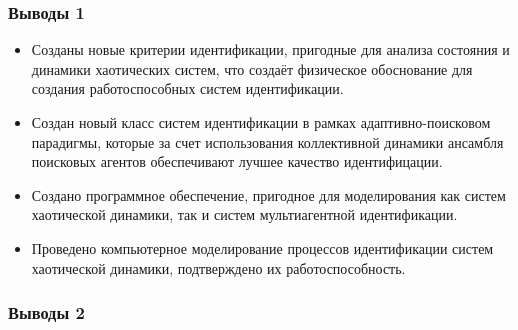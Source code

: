 \documentclass[10pt,utf8]{beamer}
\begin{document}

\begin{frame}
  \frametitle{Выводы 1}

  \begin{itemize}

    \item
      Созданы новые критерии идентификации,
      пригодные для анализа состояния и динамики хаотических систем, что создаёт
      физическое  обоснование для создания работоспособных систем идентификации.

    \item
      Создан новый класс систем идентификации в рамках адаптивно-поисковом парадигмы,
      которые за счет использования коллективной динамики ансамбля поисковых
      агентов обеспечивают лучшее качество идентифицации.

    \item
      Создано программное обеспечение, пригодное для моделирования как систем
      хаотической динамики, так и систем мультиагентной идентификации.

    \item
      Проведено компьютерное моделирование процессов идентификации систем хаотической
      динамики, подтверждено их работоспособность.

  \end{itemize}


\end{frame}




\begin{frame}
  \frametitle{Выводы 2}


\end{frame}
\end{document}
